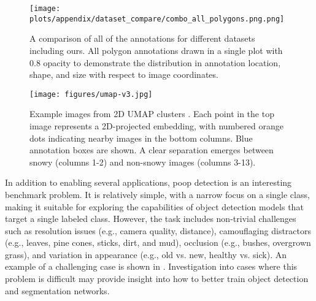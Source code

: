\begin{figure*}[t]
\centering
\texttt{[image: plots/appendix/dataset\_compare/combo\_all\_polygons.png.png]}
\caption[]{
    A comparison of all of the annotations for different datasets including ours.
    All polygon annotations drawn in a single plot with $0.8$ opacity to
    demonstrate the distribution in annotation location, shape, and size with
    respect to image coordinates.
}
\label{fig:compare_allannots}
\end{figure*}

\begin{figure*}[t]
\centering
\texttt{[image: figures/umap-v3.jpg]}%
\caption[]{
    Example images from 2D UMAP clusters \cite{mcinnes_umap_2020}.
    Each point in the top image represents a 2D-projected embedding, with numbered orange dots indicating nearby
      images in the bottom columns.
    Blue annotation boxes are shown.
    A clear separation emerges between snowy (columns 1-2) and non-snowy images (columns 3-13).
}
\label{fig:umap_dataset_viz}
\end{figure*}


In addition to enabling several applications, poop detection is an interesting benchmark problem.
It is relatively simple, with a narrow focus on a single class, making it suitable for exploring the
  capabilities of object detection models that target a single labeled class.
However, the task includes non-trivial challenges such as resolution issues (e.g., camera quality,
  distance), camouflaging distractors (e.g., leaves, pine cones, sticks, dirt, and mud), occlusion (e.g., bushes, overgrown
  grass), and variation in appearance (e.g., old vs. new, healthy vs. sick).
An example of a challenging case is shown in .
Investigation into cases where this problem is difficult may provide insight
into how to better train object detection and segmentation networks.


